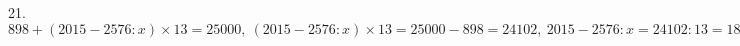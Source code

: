 21. $898+(2015-2576:x)\times 13=25000,\ (2015-2576:x)\times 13=25000-898=24102,\ 2015-2576:x=24102:13=1854,\ 2576:x=2015-1854=161,\ x=2576:161=16.$\\
